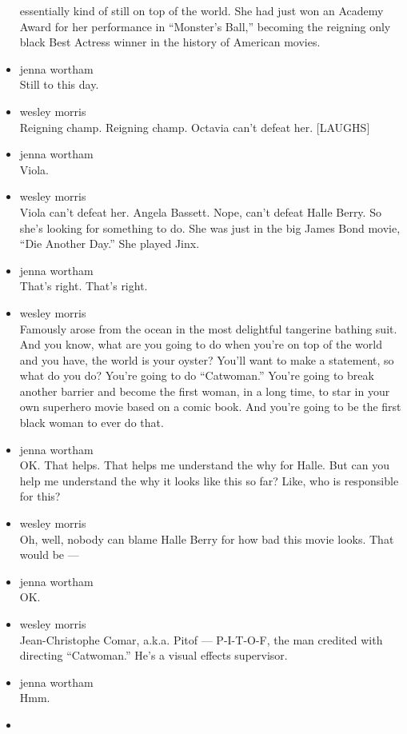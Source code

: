 \begin{itemize}
  essentially kind of still on top of the world. She had just won an
  Academy Award for her performance in ``Monster's Ball,'' becoming the
  reigning only black Best Actress winner in the history of American
  movies.
\item
  jenna wortham\\
  Still to this day.
\item
  wesley morris\\
  Reigning champ. Reigning champ. Octavia can't defeat her. {[}LAUGHS{]}
\item
  jenna wortham\\
  Viola.
\item
  wesley morris\\
  Viola can't defeat her. Angela Bassett. Nope, can't defeat Halle
  Berry. So she's looking for something to do. She was just in the big
  James Bond movie, ``Die Another Day.'' She played Jinx.
\item
  jenna wortham\\
  That's right. That's right.
\item
  wesley morris\\
  Famously arose from the ocean in the most delightful tangerine bathing
  suit. And you know, what are you going to do when you're on top of the
  world and you have, the world is your oyster? You'll want to make a
  statement, so what do you do? You're going to do ``Catwoman.'' You're
  going to break another barrier and become the first woman, in a long
  time, to star in your own superhero movie based on a comic book. And
  you're going to be the first black woman to ever do that.
\item
  jenna wortham\\
  OK. That helps. That helps me understand the why for Halle. But can
  you help me understand the why it looks like this so far? Like, who is
  responsible for this?
\item
  wesley morris\\
  Oh, well, nobody can blame Halle Berry for how bad this movie looks.
  That would be ---
\item
  jenna wortham\\
  OK.
\item
  wesley morris\\
  Jean-Christophe Comar, a.k.a. Pitof --- P-I-T-O-F, the man credited
  with directing ``Catwoman.'' He's a visual effects supervisor.
\item
  jenna wortham\\
  Hmm.
\item

\end{itemize}
